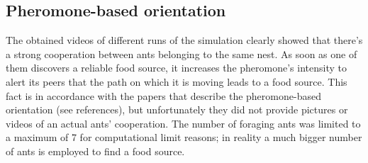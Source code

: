 \documentclass[11pt]{article}
\begin{document}
\subsection{Pheromone-based orientation}
The obtained videos of different runs of the simulation clearly showed that there's a strong cooperation between ants belonging to the same nest. As soon as one of them discovers a reliable food source, it increases the pheromone's intensity to alert its peers that the path on which it is moving leads to a food source. This fact is in accordance with the papers that describe the pheromone-based orientation (see references), but unfortunately they did not provide pictures or videos of an actual ants' cooperation. The number of foraging ants was limited to a maximum of 7 for computational limit reasons; in reality a much bigger number of ants is employed to find a food source.
\end{document}
